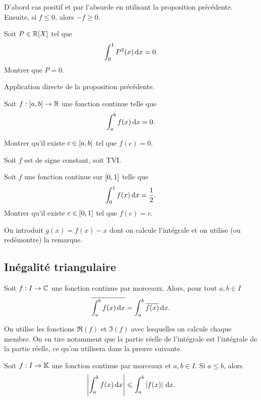 \documentclass{magnolia}
\begin{document}
\begin{preuve}
D'abord cas positif et par l'absurde en utilisant la proposition précédente. Ensuite, si $f\leq 0$, alors $-f\geq 0$.
\end{preuve}

\begin{exos}
\exo[utile=3] Soit $P\in\polyR$ tel que
  \[\int_{0}^{1} P^2(x)\,\text{d}x=0.\]
  Montrer que $P=0$.
  \begin{sol}
  Application directe de la proposition précédente.
  \end{sol}
\exo Soit $f:[a,b]\to\mathbb{R}$ une fonction continue telle que
  \[\int_{a}^{b} f(x)\,\text{d}x=0.\]
  
  Montrer qu'il existe $c\in\left[a,b\right]$ tel que $f(c)=0$.
  \begin{sol}
  Soit $f$ est de signe constant, soit TVI.
  \end{sol}
\exo[utile=1] Soit $f$ une fonction continue sur $\left[0,1\right]$ telle que
  \[\int_{0}^{1} f(x)\,\text{d}x=\frac{1}{2}.\]
  Montrer qu'il existe $c\in\left[0,1\right]$ tel que $f(c)=c$.
  \begin{sol}
  On introduit $g(x)=f(x)-x$ dont on calcule l'intégrale et on utilise (ou redémontre) la remarque.
  \end{sol}
\end{exos}

\subsection{Inégalité triangulaire}

\begin{proposition}[utile=-1]
Soit $f:I\to\mathbb{C}$ une fonction continue par morceaux. Alors, pour tout $a,b\in I$
\[\overline{\int_{a}^{b} f(x)\,\text{d}x}= \int_{a}^{b} \overline{f(x)}\,\text{d}x.\]
\end{proposition}

\begin{preuve}
On utilise les fonctions $\Re(f)$ et $\Im(f)$ avec lesquelles on calcule chaque membre. On en tire notamment que la partie réelle de l'intégrale est l'intégrale de la partie réelle, ce qu'on utilisera dans la preuve suivante.
\end{preuve}

\begin{proposition}[utile=3,nom=Inégalité triangulaire]
Soit $f:I\to\mathbb{K}$ une fonction continue par morceaux et $a,b\in I$. Si
$a\leq b$, alors
\[\left|\int_{a}^{b} f(x)\,\text{d}x\right|\leqslant \int_{a}^{b} \left|f(x)\right|\,\text{d}x.\]
\end{proposition}
\end{document}
